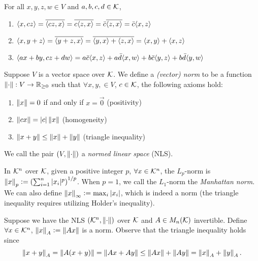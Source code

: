 \begin{note*}
For all $x,y,z,w \in V$ and $a,b,c,d \in \mathcal{K}$,
\begin{enumerate}[label=(\arabic*)]
    \item $\langle x, cz\rangle = \overline{\langle cz, x\rangle} = \overline{c \langle z, x\rangle} = \Bar{c} \overline{\langle z, x\rangle} = \Bar{c} \langle x, z\rangle$
    \item $\langle x, y+z\rangle = \overline{\langle y+z, x\rangle} = \overline{\langle y, x\rangle + \langle z, x\rangle} = \langle x, y\rangle + \langle x, z\rangle$
    \item $\langle ax+by, cz+dw\rangle = a\Bar{c}\langle x, z\rangle + a\Bar{d}\langle x, w\rangle + b\Bar{c}\langle y, z\rangle + b\Bar{d}\langle y, w\rangle$
\end{enumerate}
\end{note*}

\begin{definition}
\label{def:vector-norm}
Suppose $V$ is a vector space over $\mathcal{K}$. We define a \textit{(vector) norm} to be a function $\left\lVert\cdot\right\rVert:V \rightarrow \mathbb R_{\geq 0}$ such that $\forall x,y, \in V$, $c \in \mathcal{K}$, the following axioms hold:
\begin{enumerate}[label=(\roman*)]
    \item $\left\lVert x\right\rVert = 0$ if and only if $x = \Vec{0}$ (positivity)
    \item $\left\lVert cx\right\rVert = |c|\left\lVert x\right\rVert$ (homogeneity)
    \item $\left\lVert x+y\right\rVert \leq \left\lVert x\right\rVert + \left\lVert y\right\rVert$ (triangle inequality)
\end{enumerate}
\end{definition}

\begin{definition}
\label{def:normed-linear-space}
We call the pair $(V, \left\lVert\cdot\right\rVert)$ a \textit{normed linear space} (NLS).
\end{definition}

\begin{example}
In $\mathcal{K}^n$ over $\mathcal{K}$, given a positive integer $p$, $\forall x \in \mathcal{K}^n$, the $L_p$-norm is $\left\lVert x\right\rVert_p \vcentcolon= \left(\sum_{i=1}^n |x_i|^p\right)^{1/p}$. When $p = 1$, we call the $L_1$-norm the \textit{Manhattan norm}. We can also define $\left\lVert x\right\rVert_\infty \vcentcolon= \max_i |x_i|$, which is indeed a norm (the triangle inequality requires utilizing Holder's inequality).
\end{example}

\begin{example}
Suppose we have the NLS $(\mathcal{K}^n, \left\lVert\cdot\right\rVert)$ over $\mathcal{K}$ and $A \in M_n(\mathcal{K})$ invertible. Define $\forall x \in \mathcal{K}^n$, $\left\lVert x\right\rVert_A \vcentcolon= \left\lVert Ax\right\rVert$ is a norm. Observe that the triangle inequality holds since
$$
\left\lVert x+y\right\rVert_A = \left\lVert A(x+y)\right\rVert = \left\lVert Ax+Ay\right\rVert \leq \left\lVert Ax\right\rVert + \left\lVert Ay\right\rVert = \left\lVert x\right\rVert_A + \left\lVert y\right\rVert_A.
$$
\end{example}

